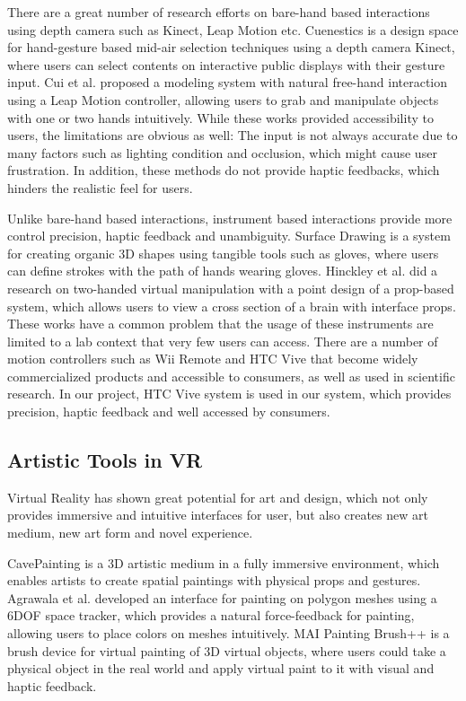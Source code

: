 There are a great number of research efforts \cite{walter2014cuenesics,cui2016exploration,ramani2015gesture,murugappan2013handy,han2014virtual} on bare-hand based interactions using depth camera such as Kinect, Leap Motion etc.
Cuenestics \cite{walter2014cuenesics} is a design space for hand-gesture based mid-air selection techniques using a depth camera Kinect, where users can select contents on interactive public displays with their gesture input.
Cui et al. \cite{cui2016exploration} proposed a modeling system with natural free-hand interaction using a Leap Motion controller, allowing users to grab and manipulate objects with one or two hands intuitively.
While these works provided accessibility to users, the limitations are obvious as well: The input is not always accurate due to many factors such as lighting condition and occlusion, which might cause user frustration.
In addition, these methods do not provide haptic feedbacks, which hinders the realistic feel for users.

Unlike bare-hand based interactions, instrument based interactions provide more control precision, haptic feedback and unambiguity.
Surface Drawing \cite{schkolne2001surface} is a system for creating organic 3D shapes using tangible tools such as gloves, where users can define strokes with the path of hands wearing gloves.
Hinckley et al. \cite{hinckley1998two} did a research on two-handed virtual manipulation with a point design of a prop-based system, which allows users to view a cross section of a brain with interface props.
These works have a common problem that the usage of these instruments are limited to a lab context that very few users can access.
There are a number of motion controllers such as Wii Remote \cite{wingcrave2010wii} and HTC Vive \cite{niehorster2017accuracy} that become widely commercialized products and accessible to consumers, as well as used in scientific research.
In our project, HTC Vive system is used in our system, which provides precision, haptic feedback and well accessed by consumers.

\subsection{Artistic Tools in VR}
\label{sec:2.2}
Virtual Reality has shown great potential for art and design, which not only provides immersive and intuitive interfaces for user, but also creates new art medium, new art form and novel experience\cite{laviola20113d}.

CavePainting \cite{keefe2001cavepainting} is a 3D artistic medium in a fully immersive environment, which enables artists to create spatial paintings with physical props and gestures. Agrawala et al.\cite{agrawala19953d} developed an interface for painting on polygon meshes using a 6DOF space tracker, which provides a natural force-feedback for painting, allowing users to place colors on meshes intuitively. MAI Painting Brush++ \cite{otsuki2017brush} is a brush device for virtual painting of 3D virtual objects, where users could take a physical object in the real world and apply virtual paint to it with visual and haptic feedback.

